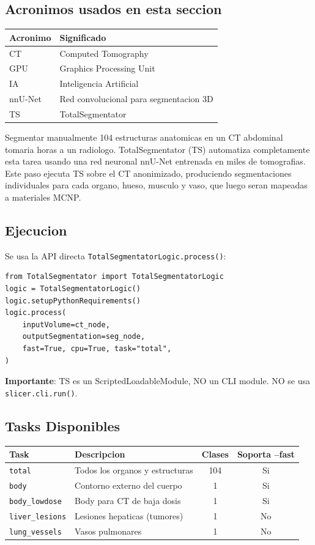 \documentclass[12pt,a4paper]{article}
\begin{document}
\subsection*{Acronimos usados en esta seccion}
\begin{tabular}{ll}
\toprule
\textbf{Acronimo} & \textbf{Significado} \\
\midrule
CT & Computed Tomography \\
GPU & Graphics Processing Unit \\
IA & Inteligencia Artificial \\
nnU-Net & Red convolucional para segmentacion 3D \\
TS & TotalSegmentator \\
\bottomrule
\end{tabular}

Segmentar manualmente 104 estructuras anatomicas en un CT abdominal tomaria horas a un radiologo.
TotalSegmentator (TS) automatiza completamente esta tarea usando una red neuronal nnU-Net
entrenada en miles de tomografias. Este paso ejecuta TS sobre el CT anonimizado, produciendo
segmentaciones individuales para cada organo, hueso, musculo y vaso, que luego seran mapeadas
a materiales MCNP.

\subsection{Ejecucion}

Se usa la API directa \texttt{TotalSegmentatorLogic.process()}:

\begin{verbatim}
from TotalSegmentator import TotalSegmentatorLogic
logic = TotalSegmentatorLogic()
logic.setupPythonRequirements()
logic.process(
    inputVolume=ct_node,
    outputSegmentation=seg_node,
    fast=True, cpu=True, task="total",
)
\end{verbatim}

\textbf{Importante}: TS es un ScriptedLoadableModule, NO un CLI module.
NO se usa \texttt{slicer.cli.run()}.

\subsection{Tasks Disponibles}

\begin{table}[H]
\centering
\begin{tabular}{l l c c}
\toprule
\textbf{Task} & \textbf{Descripcion} & \textbf{Clases} & \textbf{Soporta --fast} \\
\midrule
\texttt{total} & Todos los organos y estructuras & 104 & Si \\
\texttt{body} & Contorno externo del cuerpo & 1 & Si \\
\texttt{body\_lowdose} & Body para CT de baja dosis & 1 & Si \\
\texttt{liver\_lesions} & Lesiones hepaticas (tumores) & 1 & No \\
\texttt{lung\_vessels} & Vasos pulmonares & 1 & No \\
\bottomrule
\end{tabular}
\end{table}
\end{document}
